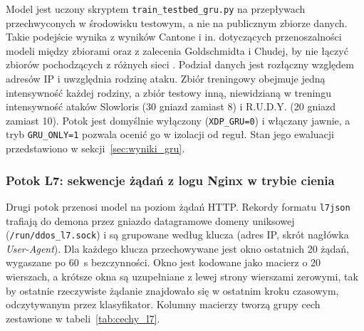 \documentclass[a4paper,12pt]{article}
\begin{document}
Model jest uczony skryptem \texttt{train\_testbed\_gru.py} na przepływach przechwyconych w środowisku testowym, a nie na publicznym zbiorze danych. Takie podejście wynika z wyników Cantone i in. dotyczących przenoszalności modeli między zbiorami \cite{cantone2024machine} oraz z zalecenia Goldschmidta i Chudej, by nie łączyć zbiorów pochodzących z różnych sieci \cite{goldschmidt2025network}. Podział danych jest rozłączny względem adresów IP i uwzględnia rodzinę ataku. Zbiór treningowy obejmuje jedną intensywność każdej rodziny, a zbiór testowy inną, niewidzianą w treningu intensywność ataków Slowloris (30 gniazd zamiast 8) i R.U.D.Y. (20 gniazd zamiast 10). Potok jest domyślnie wyłączony (\texttt{XDP\_GRU=0}) i włączany jawnie, a tryb \texttt{GRU\_ONLY=1} pozwala ocenić go w izolacji od reguł. Stan jego ewaluacji przedstawiono w sekcji~\ref{sec:wyniki_gru}.

\subsubsection{Potok L7: sekwencje żądań z logu Nginx w trybie cienia}\label{sec:gru_l7}
Drugi potok przenosi model na poziom żądań HTTP. Rekordy formatu \texttt{l7json} trafiają do demona przez gniazdo datagramowe domeny uniksowej (\texttt{/run/ddos\_l7.sock}) i są grupowane według klucza (adres IP, skrót nagłówka \textit{User-Agent}). Dla każdego klucza przechowywane jest okno ostatnich 20 żądań, wygaszane po 60~s bezczynności. Okno jest kodowane jako macierz o 20 wierszach, a krótsze okna są uzupełniane z lewej strony wierszami zerowymi, tak by ostatnie rzeczywiste żądanie znajdowało się w ostatnim kroku czasowym, odczytywanym przez klasyfikator. Kolumny macierzy tworzą grupy cech zestawione w tabeli~\ref{tab:cechy_l7}.
\end{document}
